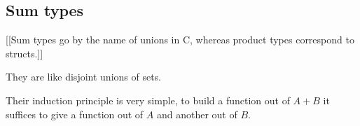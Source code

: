 \subsection{Sum types}

[[Sum types go by the name of unions in C, whereas product types correspond to structs.]]

They are like disjoint unions of sets.

Their induction principle is very simple, to build a function out of $A + B$ it suffices to give a function out of $A$ and another out of $B$.


